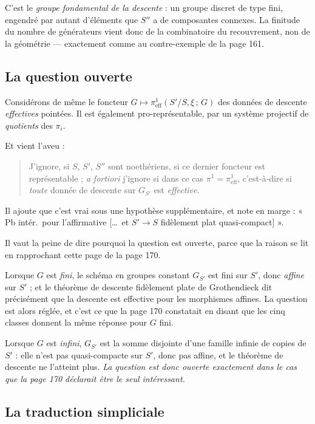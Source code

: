 \documentclass[11pt,a4paper]{article}
\begin{document}
C'est le \emph{groupe fondamental de la descente} : un groupe discret de type
fini, engendré par autant d'éléments que $S''$ a de composantes connexes. La
finitude du nombre de générateurs vient donc de la combinatoire du
recouvrement, non de la géométrie --- exactement comme au contre-exemple de la
page 161.

\subsection*{La question ouverte}

Considérons de même le foncteur
$G \mapsto \pi^{1}_{\mathrm{eff}}(S'/S, \xi\,;\, G)$ des données de descente
\emph{effectives} pointées. Il est également pro-représentable, par un système
projectif de \emph{quotients} des $\pi_{i}$.

Et vient l'aveu :

\begin{quote}
J'ignore, si $S$, $S'$, $S''$ sont noethériens, si ce dernier foncteur est
représentable ; \emph{a fortiori} j'ignore si dans ce cas
$\pi^{1} = \pi^{1}_{\mathrm{eff}}$, c'est-à-dire si \emph{toute} donnée de
descente sur $G_{S'}$ est \emph{effective}.
\end{quote}

Il ajoute que c'est vrai sous une hypothèse supplémentaire, et note en marge :
« Pb intér.\ pour l'affirmative [\dots\ et $S' \to S$ fidèlement plat
quasi-compact] ».

Il vaut la peine de dire pourquoi la question est ouverte, parce que la raison
se lit en rapprochant cette page de la page 170.

Lorsque $G$ est \emph{fini}, le schéma en groupes constant $G_{S'}$ est fini
sur $S'$, donc \emph{affine} sur $S'$ ; et le théorème de descente fidèlement
plate de Grothendieck dit précisément que la descente est effective pour les
morphismes affines. La question est alors réglée, et c'est ce que la page 170
constatait en disant que les cinq classes donnent la même réponse pour $G$
fini.

Lorsque $G$ est \emph{infini}, $G_{S'}$ est la somme disjointe d'une famille
infinie de copies de $S'$ : elle n'est pas quasi-compacte sur $S'$, donc pas
affine, et le théorème de descente ne l'atteint plus. \emph{La question est
donc ouverte exactement dans le cas que la page 170 déclarait être le seul
intéressant.}

\subsection*{La traduction simpliciale}
\end{document}

